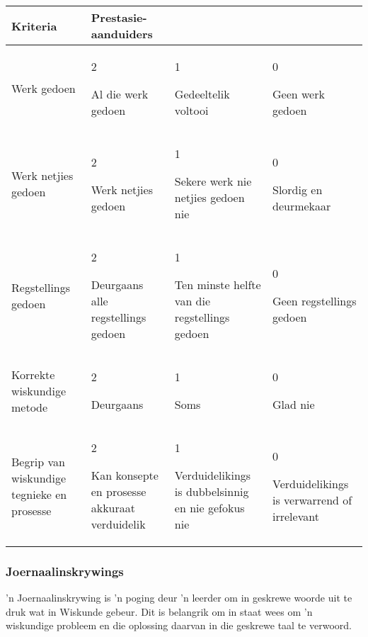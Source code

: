 \begin{table}[H]
 \begin{center}
  \begin{tabular}{|p{3cm}|p{3cm}|p{3cm}|p{3cm}|} \hline
   \textbf{Kriteria} & \textbf{Prestasie-aanduiders} &&\\ \hline
Werk gedoen & 2 \par Al die werk gedoen  & 1 \par Gedeeltelik voltooi & 0 \par Geen werk gedoen \\ \hline
Werk netjies gedoen & 2 \par Werk netjies gedoen & 1 \par Sekere werk nie netjies gedoen nie & 0 \par Slordig en deurmekaar\\ \hline
Regstellings gedoen & 2 \par Deurgaans alle regstellings gedoen & 1 \par Ten minste helfte van die regstellings gedoen & 0 \par Geen regstellings gedoen \\ \hline
Korrekte wiskundige metode & 2 \par Deurgaans & 1 \par Soms & 0 \par Glad nie \\ \hline
Begrip van wiskundige tegnieke en prosesse & 2 \par Kan konsepte en prosesse akkuraat verduidelik & 1 \par Verduidelikings is dubbelsinnig en nie gefokus nie & 0 \par Verduidelikings is verwarrend of irrelevant \\ \hline
  \end{tabular}

 \end{center}

\end{table}

\subsubsection{Joernaalinskrywings}
'n Joernaalinskrywing is 'n poging deur 'n leerder om in geskrewe woorde uit te druk wat in Wiskunde gebeur. Dit is belangrik om in staat wees om 'n wiskundige probleem en die oplossing daarvan in die geskrewe taal te verwoord.

